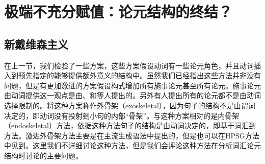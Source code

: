\section{极端不充分赋值：论元结构的终结？}
\label{radical-sec}

\subsection{新戴维森主义}

在上一节，我们检验了一些方案，这些方案假设动词有一些论元角色，并且动词插入到预先指定的能够提供额外意义的结构中。虽然我们已经指出这些方法并非没有问题，但是有更加激进的方案假设构式增加所有施事论元甚至所有论元。施事论元由动词提供这一观点是由\citet{Marantz84a, Marantz97a}、\citet{Kratzer96a}和\citet{Embick2004a}等人提出的。另外有人提出所有的论元都不是由动词选择限制的。\citet{Borer2003a-u}将这种方案称作外骨架（exoskeletal），因为句子的结构不是由谓词决定的，即动词没有投射到小句的内部“骨架”。与这种方案相对的是内骨架（endoskeletal）方法，依据这种方法句子的结构是由动词决定的，即基于词汇到方法。激进外骨架方法主要是在主流生成语法\citep{Borer94a-u,Borer2003a-u,Borer2005a-u,Schein93a-u,HK97a-u,Lohndal2012a}中提出的，但是也可以在HPSG\citep{Haugereid2009a}方法中见到。这里我们不详细讨论这种方法，但是我们会评论这种方法在分析词汇论元结构时讨论的主要问题。
